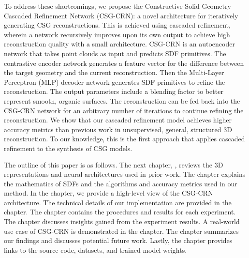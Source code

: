 To address these shortcomings, we propose the Constructive Solid Geometry Cascaded Refinement Network (CSG-CRN): a novel architecture for iteratively generating CSG reconstructions. This is achieved using cascaded refinement, wherein a network recursively improves upon its own output to achieve high reconstruction quality with a small architecture. CSG-CRN is an autoencoder network that takes point clouds as input and predicts SDF primitives. The contrastive encoder network generates a feature vector for the difference between the target geometry and the current reconstruction. Then the Multi-Layer Perceptron (MLP) decoder network generates SDF primitives to refine the reconstruction. The output parameters include a blending factor to better represent smooth, organic surfaces. The reconstruction can be fed back into the CSG-CRN network for an arbitrary number of iterations to continue refining the reconstruction. We show that our cascaded refinement model achieves higher accuracy metrics than previous work in unsupervised, general, structured 3D reconstruction. To our knowledge, this is the first approach that applies cascaded refinement to the synthesis of CSG models.

The outline of this paper is as follows. The next chapter, , reviews the 3D representations and neural architectures used in prior work. The  chapter explains the mathematics of SDFs and the algorithms and accuracy metrics used in our method. In the  chapter, we provide a high-level view of the CSG-CRN architecture. The technical details of our implementation are provided in the  chapter. The  chapter contains the procedures and results for each experiment. The  chapter discusses insights gained from the experiment results. A real-world use case of CSG-CRN is demonstrated in the  chapter. The  chapter summarizes our findings and discusses potential future work. Lastly, the  chapter provides links to the source code, datasets, and trained model weights.
